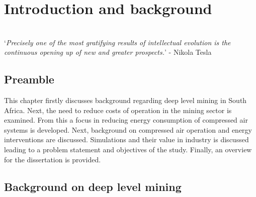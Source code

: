 \chapter{Introduction and background}  %
\thispagestyle{empty}
\vspace{38em}
\hrulefill
\\
\enquote*{\textit{Precisely one of the most gratifying results of intellectual evolution is the continuous opening up of new and greater prospects.}} -  Nikola Tesla\\
\newpage

\section{Preamble}
This chapter firstly discusses background regarding deep level mining in South Africa. Next, the need to reduce costs of operation in the mining sector is examined. From this a focus in reducing energy consumption of compressed air systems is developed. Next, background on compressed air operation and energy interventions are discussed. Simulations and their value in industry is discussed leading to a problem statement and objectives of the study. Finally, an overview for the dissertation is provided.
\section{Background on deep level mining}
